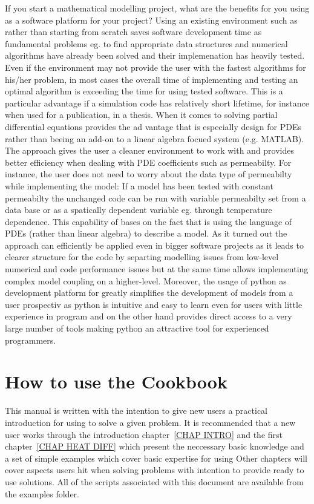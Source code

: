 If you start a mathematical modelling project, what are the benefits for you using \esc as a software 
platform for your project? Using an existing environment such as \esc rather than starting from scratch saves software development time as fundamental problems eg. to find appropriate data structures and numerical algorithms have already been solved and their implemenation has heavily tested. Even if the environment may not provide the user with the fastest algorithms for his/her problem, in most cases the overall time of implementing and testing an optimal algorithm is exceeding the time for using tested software. This is a particular advantage if a simulation code has relatively short lifetime, for instance when used for a publication, in a thesis. When it comes to solving partial differential equations \esc provides the ad vantage that is especially design for PDEs rather than beeing an add-on to a linear algebra focued system (e.g. MATLAB). The \esc approach gives the user a cleaner 
environment to work with and provides better efficiency when dealing with PDE coefficients such as permeabilty. 
For instance, the user does not need to worry about the data type of permeabilty while implementing the model:
If a model has been tested with constant permeabilty the unchanged code can be run with variable permeabilty set from a data base or as a spatically dependent variable eg. through temperature dependence. This capability of \esc bases on the fact that \esc is 
using the language of PDEs (rather than linear algebra) to describe a model. As it turned out the \esc approach can efficiently be applied even in bigger software projects as it leads to clearer structure for the code by separting modelling issues from low-level numerical and code performance issues but at the same time allows implementing complex model coupling on a higher-level. Moreover,
the usage of python as development platform for \esc greatly simplifies the development of models from a user prospectiv as 
python is intuitive and easy to learn even for users with little experience in program and on the other hand provides direct 
access to a very large number of tools making python an attractive tool for experienced programmers.    

\section{How to use the Cookbook}
This manual is written with the intention to give new users a practical introduction for using \esc to solve a given problem. It is recommended that a new user works through 
the introduction chapter~\ref{CHAP INTRO} and the first chapter~\ref{CHAP HEAT DIFF} which present the neccessary basic knowledge and a set of simple examples which cover basic expertise for using \esc Other chapters
will cover aspects users hit when solving problems with intention to provide ready to use solutions.   
All of the \esc scripts associated with this document are available from the examples folder.


 



